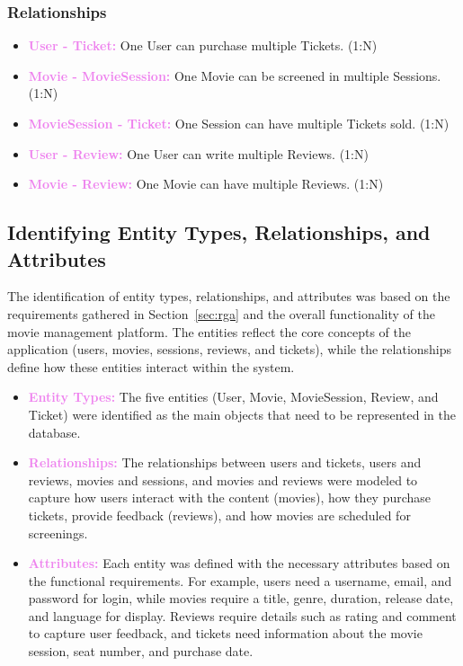 \documentclass[a4paper,12pt]{article}  %
\renewcommand{\textbf}[1]{\textcolor{violet}{\bfseries #1}}
\begin{document}
\subsubsection{Relationships}
\begin{itemize}
    \item \textbf{User - Ticket:} One User can purchase multiple Tickets. (1:N)
    \item \textbf{Movie - MovieSession:} One Movie can be screened in multiple Sessions. (1:N)
    \item \textbf{MovieSession - Ticket:} One Session can have multiple Tickets sold. (1:N)
    \item \textbf{User - Review:} One User can write multiple Reviews. (1:N)
    \item \textbf{Movie - Review:} One Movie can have multiple Reviews. (1:N)
\end{itemize}




\subsection{Identifying Entity Types, Relationships, and Attributes}

The identification of entity types, relationships, and attributes was based on the requirements gathered in Section~\ref{sec:rga} and the overall functionality of the movie management platform. The entities reflect the core concepts of the application (users, movies, sessions, reviews, and tickets), while the relationships define how these entities interact within the system. 

\begin{itemize}
    \item \textbf{Entity Types:} The five entities (User, Movie, MovieSession, Review, and Ticket) were identified as the main objects that need to be represented in the database.
    \item \textbf{Relationships:} The relationships between users and tickets, users and reviews, movies and sessions, and movies and reviews were modeled to capture how users interact with the content (movies), how they purchase tickets, provide feedback (reviews), and how movies are scheduled for screenings.
    \item \textbf{Attributes:} Each entity was defined with the necessary attributes based on the functional requirements. For example, users need a username, email, and password for login, while movies require a title, genre, duration, release date, and language for display. Reviews require details such as rating and comment to capture user feedback, and tickets need information about the movie session, seat number, and purchase date.
\end{itemize}
\end{document}
